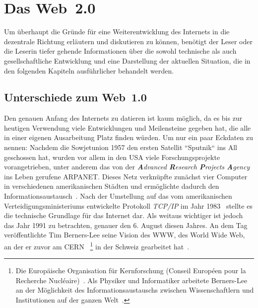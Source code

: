 \section{Das Web~2.0}

Um überhaupt die Gründe für eine Weiterentwicklung des Internets in die dezentrale Richtung erläutern und diskutieren zu können, benötigt der Leser oder die Leserin tiefer gehende Informationen über die sowohl technische als auch gesellschaftliche Entwicklung und eine Darstellung der aktuellen Situation, die in den folgenden Kapiteln ausführlicher behandelt werden.


\subsection{Unterschiede zum Web~1.0}

Den genauen Anfang des Internets zu datieren ist kaum möglich, da es bis zur heutigen Verwendung viele Entwicklungen und Meilensteine gegeben hat, die alle in einer eigenen Ausarbeitung Platz finden würden. 
Um nur ein paar Eckdaten zu nennen: Nachdem die Sowjetunion 1957 den ersten Satellit ``Sputnik`` ins All geschossen hat, wurden vor allem in den USA viele Forschungsprojekte vorangetrieben, unter anderem das von der 
\textit{\textbf{A}dvanced \textbf{R}esearch \textbf{P}rojects \textbf{A}gency} 
ins Leben gerufene ARPANET. 
Dieses Netz verknüpfte zunächst vier Computer in verschiedenen amerikanischen Städten und ermöglichte dadurch den In\-for\-ma\-tions\-aus\-tausch~\cite{Krause.2008}. Nach der Umstellung auf das vom amerikanischen Verteidigungsministeriums entwickelte Protokoll \textit{TCP/IP} im Jahr 1983~\cite{Held.2002} stellte es die technische Grundlage für das Internet dar.
Als weitaus wichtiger ist jedoch das Jahr 1991 zu betrachten, genauer den 6. August diesen Jahres. An dem Tag veröffentlichte Tim Berners-Lee seine Vision des WWW, des World Wide Web, an der er zuvor am CERN~
\footnote{
	Die Europäische Organisation für Kernforschung (Conseil Européen pour la Recherche Nucléaire)~\cite{Weltmaschine.de.2019}. Als Physiker und Informatiker arbeitete Berners-Lee an der Möglichkeit des Informationsaustauschs zwischen Wissenschaftlern und Institutionen auf der ganzen Welt~\cite{CERN.2020}.
} 
in der Schweiz gearbeitet hat~\cite{Fiedler.2016}. 

\smallskip

